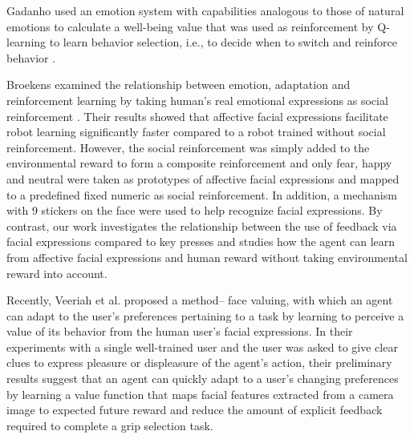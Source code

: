\documentclass[10pt,journal,compsoc]{IEEEtran}
\begin{document}
Gadanho used an emotion system with capabilities analogous to those of natural emotions to calculate a well-being value that was used as reinforcement by Q-learning to learn behavior selection, i.e., to decide when to switch and reinforce behavior \cite{gadanho2003learning}. %

Broekens examined the relationship between emotion, adaptation and reinforcement learning by taking human's real emotional expressions as social reinforcement \cite{broekens2007emotion}. Their results showed that affective facial expressions facilitate robot learning significantly faster compared to a robot trained without social reinforcement.  %
However, the social reinforcement was simply added to the environmental reward to form a composite reinforcement and only fear, happy and neutral were taken as prototypes of affective facial expressions and mapped to a predefined fixed numeric as social reinforcement. In addition, a mechanism with 9 stickers on the face were used to help recognize facial expressions. By contrast, our work investigates the relationship between the use of feedback via facial expressions compared to key presses and studies how the agent can learn from affective facial expressions and human reward without taking environmental reward into account. %

Recently, Veeriah et al. \cite{veeriah2016face} proposed a method-- face valuing, with which an agent can adapt to the user's preferences pertaining to a task by learning to perceive a value of its behavior from the human user's facial expressions. In their experiments with a single well-trained user and the user was asked to give clear clues to express pleasure or displeasure of the agent's action, their preliminary results suggest that an agent can quickly adapt to a user's changing preferences by learning a value function that maps facial features extracted from a camera image to expected future reward and reduce the amount of explicit feedback required to complete a grip selection task. 
\end{document}
